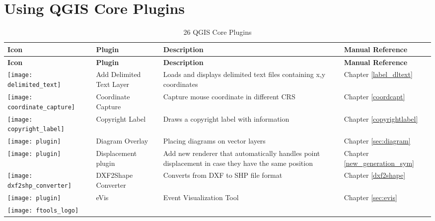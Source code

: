 
\chapter{Using QGIS Core Plugins}\label{sec:core_plugins}


{\setlength{\extrarowheight}{15pt}
\small
\begin{longtable}{|p{1.2cm}|p{3.8cm}|p{7.5cm}|p{3cm}|}
\caption{26 QGIS Core Plugins}\label{tab:core_plugins} \\
\hline
 \textbf{Icon} & \textbf{Plugin} & \textbf{Description} & \textbf{Manual Reference}\\
\endfirsthead
\hline
\textbf{Icon} & \textbf{Plugin} & \textbf{Description} & \textbf{Manual Reference}\\
\endhead
\hline
\texttt{[image: delimited\_text]}
 & Add Delimited Text Layer \index{plugins!delimited text} & Loads and displays delimited text files containing x,y coordinates & Chapter \ref{label_dltext}\\
\hline
\texttt{[image: coordinate\_capture]}
 & Coordinate Capture \index{plugins!coordinate capture}& Capture mouse coordinate in different CRS & Chapter \ref{coordcapt}\\
\hline 
\texttt{[image: copyright\_label]}
 & Copyright Label \index{plugins!copyright}& Draws a copyright label with information & Chapter \ref{copyrightlabel}\\
\hline
\texttt{[image: plugin]}
 & Diagram Overlay \index{plugins!diagram}& Placing diagrams on vector layers & Chapter \ref{sec:diagram}\\
\hline
\texttt{[image: plugin]}
 & Displacement plugin \index{plugins!point displacement}& Add new renderer that automatically handles point displacement in case they have the same position & Chapter \ref{new_generation_sym}\\
\hline
\texttt{[image: dxf2shp\_converter]}
 & DXF2Shape Converter \index{plugins!DXF2Shape}& Converts from DXF to SHP file format & Chapter \ref{dxf2shape}\\
\hline
\texttt{[image: plugin]}
 & eVis & Event Visualization Tool & Chapter \ref{sec:evis}\\
\hline
\texttt{[image: ftools\_logo]}

\end{longtable}}
